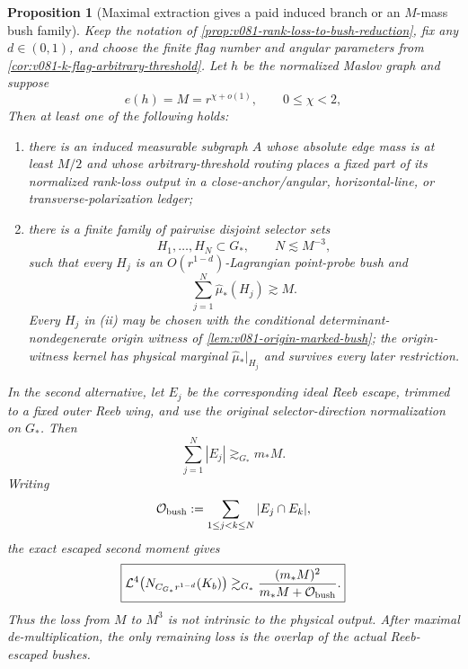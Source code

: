 \documentclass[10pt]{article}
\newtheorem{proposition}[theorem]{Proposition}
\begin{document}
\begin{proposition}[Maximal extraction gives a paid induced branch or an \(M\)-mass bush family]
\label{prop:v081-maximal-bush-family}
Keep the notation of
\cref{prop:v081-rank-loss-to-bush-reduction}, fix any \(d\in(0,1)\), and choose the finite flag
number and angular parameters from
\cref{cor:v081-k-flag-arbitrary-threshold}.  Let \(h\) be the normalized Maslov graph and suppose
\[
e(h)=M=r^{\chi+o(1)},
\qquad
0\le\chi<2,
\]
Then at least one of the following holds:
\begin{enumerate}[label=\textnormal{(\roman*)}]
\item there is an induced measurable subgraph \(A\) whose absolute edge mass is at least \(M/2\)
and whose arbitrary-threshold routing places a fixed part of its normalized rank-loss output in a
close-anchor/angular, horizontal-line, or transverse-polarization ledger;
\item there is a finite family of pairwise disjoint selector sets
\[
H_1,\ldots,H_N\subset G_*,
\qquad
N\lesssim M^{-3},
\]
such that every \(H_j\) is an \(O(r^{1-d})\)-Lagrangian point-probe bush and
\begin{equation}
\label{eq:v081-maximal-bush-direction-mass}
\boxed{
\sum_{j=1}^N\widehat\mu_*(H_j)
\gtrsim M.
}
\end{equation}
Every \(H_j\) in \textnormal{(ii)} may be chosen with the conditional determinant-nondegenerate
origin witness of \cref{lem:v081-origin-marked-bush}; the origin-witness kernel has physical
marginal \(\widehat\mu_*|_{H_j}\) and survives every later restriction.
\end{enumerate}
In the second alternative, let \(E_j\) be the corresponding ideal Reeb escape, trimmed to a fixed
outer Reeb wing, and use
the original selector-direction normalization on \(G_*\).  Then
\begin{equation}
\label{eq:v081-maximal-bush-escaped-L1}
\boxed{
\sum_{j=1}^N |E_j|
\gtrsim_{G_*}
m_*M.
}
\end{equation}
Writing
\[
\mathcal O_{\rm bush}
:=
\sum_{1\le j<k\le N}|E_j\cap E_k|,
\]
the exact escaped second moment gives
\begin{equation}
\label{eq:v081-maximal-bush-physical-second-moment}
\boxed{
\mathcal L^4\!\left(N_{C_{G_*}r^{1-d}}(K_b)\right)
\gtrsim_{G_*}
\frac{(m_*M)^2}
{m_*M+\mathcal O_{\rm bush}}.
}
\end{equation}
Thus the loss from \(M\) to \(M^3\) is not intrinsic to the physical output.  After maximal
de-multiplication, the only remaining loss is the overlap of the actual Reeb-escaped bushes.
\end{proposition}
\end{document}
